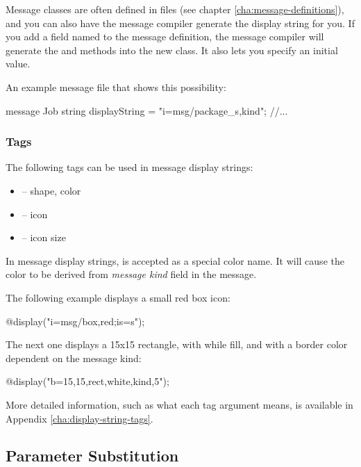 Message classes are often defined in  files (see chapter
\ref{cha:message-definitions}), and you can also have the message compiler
generate the display string for you. If you add a field named
 to the message definition, the message compiler will
generate the  and 
methods into the new class. It also lets you specify an initial value.

An example message file that shows this possibility:

\begin{msg}
message Job
{
    string displayString = "i=msg/package_s,kind";
    //...
}
\end{msg}

\subsubsection{Tags}

The following tags can be used in message display strings:

\begin{itemize}
  \item {} -- shape, color
  \item {} -- icon
  \item {} -- icon size
\end{itemize}

\begin{note}
   In message display strings,  is accepted as a special color name.
   It will cause the color to be derived from \textit{message kind} field in the message.
\end{note}

The following example displays a small red box icon:

\begin{ned}
@display("i=msg/box,red;is=s");
\end{ned}

The next one displays a 15x15 rectangle, with while fill, and with a border
color dependent on the message kind:

\begin{ned}
@display("b=15,15,rect,white,kind,5");
\end{ned}

More detailed information, such as what each tag argument means, is
available in Appendix \ref{cha:display-string-tags}.


\subsection{Parameter Substitution}

